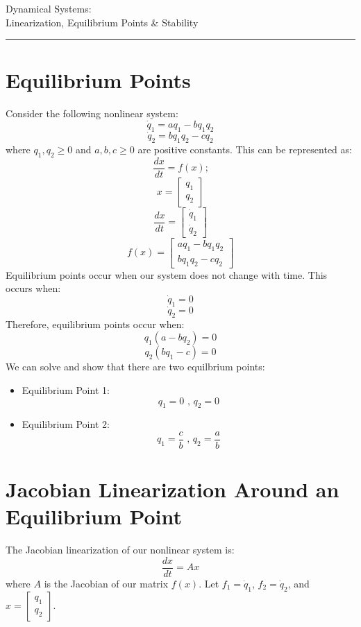 \documentclass[12pt]{article}
\begin{document}
    \begin{flushleft}
	\LARGE Dynamical Systems: \\
	Linearization, Equilibrium Points \& Stability
    \end{flushleft} 
    \rule{\linewidth}{0.4pt}


    \section*{Equilibrium Points}

	Consider the following nonlinear system:
        $$\dot q_1 = aq_1 - bq_1q_2$$
		$$\dot q_2 = bq_1q_2-cq_2$$
	where $q_1, q_2 \geq 0$ and $a, b, c \geq 0$ are positive constants.
	This can be represented as:
		$$\frac{dx}{dt} = f(x) \text{;}$$	
		$$x = \begin{bmatrix} q_1 \\ q_2 \end{bmatrix}$$
		$$\frac{dx}{dt} = \begin{bmatrix} \dot q_1 \\ \dot q_2 \end{bmatrix}$$
		$$f(x) = \begin{bmatrix} aq_1 - bq_1q_2 \\ bq_1q_2-cq_2 \end{bmatrix}$$
	Equilibrium points occur when our system does not change with time. This occurs when:
		$$\dot q_1 = 0$$
		$$\dot q_2 = 0$$
	Therefore, equilibrium points occur when:
		$$q_1 (a-bq_2) = 0$$
		$$q_2 (bq_1-c) = 0$$
	We can solve and show that there are two equilbrium points:
	\begin{itemize}
		\item Equilibrium Point 1: 
			$$q_1=0 \text{ , } q_2=0 $$

		\item Equilibrium Point 2: 
			$$q_1= \frac{c}{b} \text{ , } q_2= \frac{a}{b}$$
	\end{itemize}

	\newpage

	\section*{Jacobian Linearization Around an Equilibrium Point}
	
	The Jacobian linearization of our nonlinear system is:
		$$\frac{dx}{dt} = Ax$$
	where $A$ is the Jacobian of our matrix $f(x)$.
	Let $f_1 = \dot q_1$, $f_2 = \dot q_2$, and $x = \begin{bmatrix} q_1 \\ q_2 \end{bmatrix}$.
\end{document}
